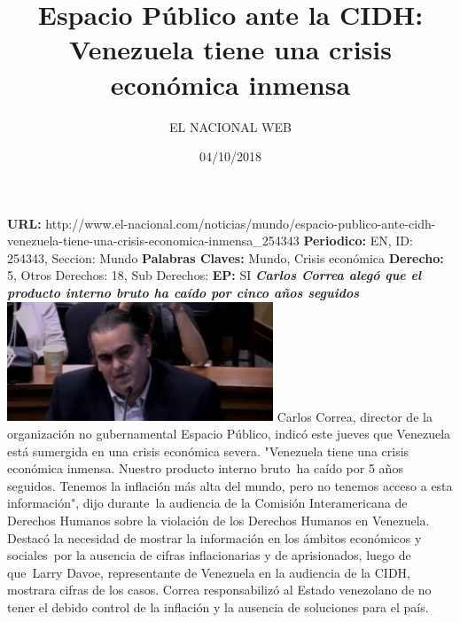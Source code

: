 \documentclass{article}%
\title{\textbf{Espacio Público ante la CIDH: Venezuela tiene una crisis económica inmensa}}%
\author{EL NACIONAL WEB}%
\date{04/10/2018}%
\begin{document}
%
\normalsize%
\maketitle%
\textbf{URL: }%
http://www.el{-}nacional.com/noticias/mundo/espacio{-}publico{-}ante{-}cidh{-}venezuela{-}tiene{-}una{-}crisis{-}economica{-}inmensa\_254343\newline%
%
\textbf{Periodico: }%
EN, %
ID: %
254343, %
Seccion: %
Mundo\newline%
%
\textbf{Palabras Claves: }%
Mundo, Crisis económica\newline%
%
\textbf{Derecho: }%
5, %
Otros Derechos: %
18, %
Sub Derechos: %
\newline%
%
\textbf{EP: }%
SI\newline%
\newline%
%
\textbf{\textit{Carlos Correa alegó que el producto interno bruto ha caído por cinco años seguidos}}%
\newline%
\newline%
%
\includegraphics[width=300px]{82.jpg}%
\newline%
%
Carlos Correa, director de la organización no gubernamental Espacio Público, indicó este jueves que Venezuela está sumergida en una crisis económica severa.%
\newline%
%
"Venezuela tiene una crisis económica inmensa. Nuestro producto interno bruto~ha caído por 5 años seguidos. Tenemos la inflación más alta del mundo, pero no tenemos acceso a esta información", dijo durante~la audiencia de la Comisión Interamericana de Derechos Humanos sobre la violación de los Derechos Humanos en Venezuela.%
\newline%
%
Destacó la necesidad de mostrar la información en los ámbitos económicos y sociales~por la ausencia de cifras inflacionarias y de aprisionados, luego de que~Larry Davoe, representante de Venezuela en la audiencia de la CIDH, mostrara cifras de los casos.%
\newline%
%
Correa responsabilizó al Estado venezolano de no tener el debido control de la inflación y la ausencia de soluciones para el país.%
\newline%
%
\end{document}
